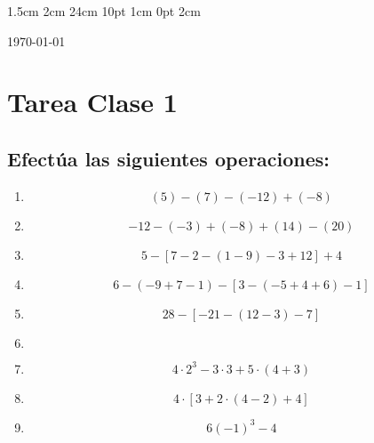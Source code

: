 \documentclass[12pt,letterpaper]{report}
\begin{document}
\setmargins{2.5cm}      
{1.5cm}                     
{2cm}  
{24cm}                    
{10pt}                          
{1cm}                          
{0pt}                             
{2cm}
\begin{flushright}
\today
\end{flushright}
\vspace{-1.75cm}
\section*{Tarea Clase 1}
\subsection*{Efectúa las siguientes operaciones:}
\begin{enumerate}
    \item \begin{equation*}
    (5)-(7)-(-12)+(-8)
    \end{equation*}
        \item \begin{equation*}
        -12-(-3)+(-8)+(14)-(20)
    \end{equation*}
        \item \begin{equation*}
        5-[7-2-(1-9)-3+12]+4
    \end{equation*}
    \item \begin{equation*}
     6-(-9+7-1)-[3-(-5+4+6)-1]
    \end{equation*}
    \item \begin{equation*}
        28-[-21-(12-3)-7]
    \end{equation*}
    \item \begin{equation*}
        [-2+3 \cdot (2-5) \div 3] [(3-5+2)-2 \cdot (3-4)]
    \end{equation*}
    \item \begin{equation*}
        4 \cdot 2^3-3 \cdot 3 +5 \cdot (4+3)
    \end{equation*}
    \item \begin{equation*}
        4 \cdot [3+2 \cdot (4-2)+4]
    \end{equation*}
    \item \begin{equation*}
        6(-1)^3-4
    \end{equation*}

\end{enumerate}
\end{document}

